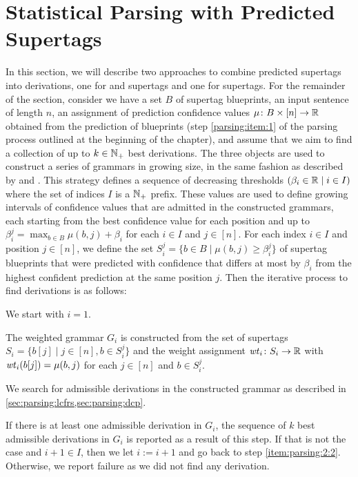 \documentclass[../../document.tex]{subfiles}
\begin{document}
    \section{Statistical Parsing with Predicted Supertags}\label{sec:parsing}
    In this section, we will describe two approaches to combine predicted supertags into derivations, one for  and  supertags and one for  supertags.
    For the remainder of the section, consider we have a set \(B\) of supertag blueprints, an input sentence of length \(n\), an assignment of prediction confidence values \(\mu\colon B \times [n] \to \mathbb{R}\) obtained from the prediction of blueprints (step \ref{parsing:item:1} of the parsing process outlined at the beginning of the chapter), and assume that we aim to find a collection of up to \(k \in \mathbb{N}_+\) best derivations.
    The three objects are used to construct a series of grammars in growing size, in the same fashion as described by \citet[Section~5.1]{Clark04} and \citet[Section~2.2.2]{Auli12}.
    This strategy defines a sequence of decreasing thresholds \((\beta_i \in \mathbb{R} \mid i \in I)\) where the set of indices \(I\) is a \(\mathbb{N}_+\) prefix.
    These values are used to define growing intervals of confidence values that are admitted in the constructed grammars, each starting from the best confidence value for each position and up to \(\beta_i^j = \max_{b \in B} \mu(b, j) + \beta_i\) for each \(i \in I\) and \(j \in [n]\).
    For each index \(i \in I\) and position \(j \in [n]\), we define the set \(S_i^j = \{ b \in B \mid \mu(b, j) \ge \beta^j_i \}\) of supertag blueprints that were predicted with confidence that differs at most by \(\beta_i\) from the highest confident prediction at the same position \(j\).
    Then the iterative process to find derivations is as follows:
    \begin{compactenum}
        \item We start with \(i = 1\).
        \item \label{item:parsing:2:2}
            The weighted grammar \(G_i\) is constructed from the set of supertags \(S_i = \{b[j] \mid j \in [n], b \in S_i^j \}\) and the weight assignment \(\mathit{wt}_{i}\colon S_i \to \mathbb{R}\) with \(\mathit{wt}_i(b[j]) = \mu(b, j)\) for each \(j \in [n]\) and \(b \in S_i^j\).
        \item We search for admissible derivations in the constructed grammar as described in \cref{sec:parsing:lcfrs,sec:parsing:dcp}.
        \item
            If there is at least one admissible derivation in \(G_i\), the sequence of \(k\) best admissible derivations in \(G_i\) is reported as a result of this step.
            If that is not the case and \(i+1 \in I\), then we let \(i := i+1\) and go back to step \ref{item:parsing:2:2}.
            Otherwise, we report failure as we did not find any derivation.
    \end{compactenum}
\end{document}
